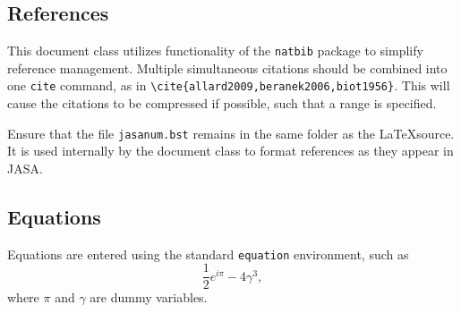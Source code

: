 \documentclass{internoise2012}
\begin{document}
\subsection{References}

This document class utilizes functionality of the \texttt{natbib}
package to simplify reference management. Multiple simultaneous
citations should be combined into one \texttt{cite} command, as in
\texttt{\textbackslash{}cite\{allard2009,beranek2006,biot1956\}}.\cite{allard2009,beranek2006,biot1956}
This will cause the citations to be compressed if possible, such that
a range is specified.

Ensure that the file \texttt{jasanum.bst} remains in the same folder
as the \LaTeX source. It is used internally by the document class to
format references as they appear in JASA.

\subsection{Equations}

Equations are entered using the standard \texttt{equation}
environment, such as
\begin{equation}
  \frac{1}{2} e^{i \pi} - 4\gamma^3,
\end{equation}
where $\pi$ and $\gamma$ are dummy variables.


\end{document}
